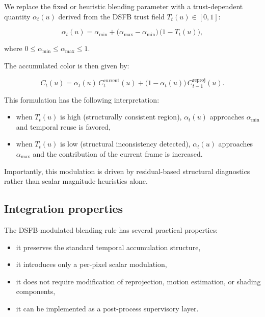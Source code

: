 \documentclass[11pt,letterpaper]{article}
\theoremstyle{gcresult}
\theoremstyle{definition}
\begin{document}
We replace the fixed or heuristic blending parameter with a trust-dependent quantity $\alpha_t(u)$ derived from the DSFB trust field $T_t(u) \in [0,1]$:

\begin{equation}
\alpha_t(u) = \alpha_{\min} 
+ \bigl(\alpha_{\max} - \alpha_{\min}\bigr)\,\bigl(1 - T_t(u)\bigr),
\end{equation}

where $0 \leq \alpha_{\min} \leq \alpha_{\max} \leq 1$.

The accumulated color is then given by:

\begin{equation}
C_t(u) = \alpha_t(u) \, C_t^{\mathrm{current}}(u)
+ \bigl(1 - \alpha_t(u)\bigr)\, C_{t-1}^{\mathrm{reproj}}(u).
\end{equation}

This formulation has the following interpretation:

\begin{itemize}[leftmargin=1.5em]
    \item when $T_t(u)$ is high (structurally consistent region), $\alpha_t(u)$ approaches $\alpha_{\min}$ and temporal reuse is favored,
    \item when $T_t(u)$ is low (structural inconsistency detected), $\alpha_t(u)$ approaches $\alpha_{\max}$ and the contribution of the current frame is increased.
\end{itemize}

Importantly, this modulation is driven by residual-based structural diagnostics rather than scalar magnitude heuristics alone.


\subsection{Integration properties}

The DSFB-modulated blending rule has several practical properties:

\begin{itemize}[leftmargin=1.5em]
    \item it preserves the standard temporal accumulation structure,
    \item it introduces only a per-pixel scalar modulation,
    \item it does not require modification of reprojection, motion estimation, or shading components,
    \item it can be implemented as a post-process supervisory layer.
\end{itemize}
\end{document}
